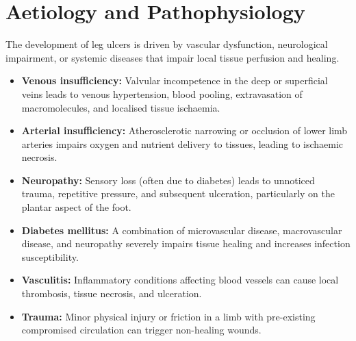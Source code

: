 \section*{Aetiology and Pathophysiology}
The development of leg ulcers is driven by vascular dysfunction, neurological impairment, or systemic diseases that impair local tissue perfusion and healing.
\begin{itemize}
    \item \textbf{Venous insufficiency:} Valvular incompetence in the deep or superficial veins leads to venous hypertension, blood pooling, extravasation of macromolecules, and localised tissue ischaemia.
    \item \textbf{Arterial insufficiency:} Atherosclerotic narrowing or occlusion of lower limb arteries impairs oxygen and nutrient delivery to tissues, leading to ischaemic necrosis.
    \item \textbf{Neuropathy:} Sensory loss (often due to diabetes) leads to unnoticed trauma, repetitive pressure, and subsequent ulceration, particularly on the plantar aspect of the foot.
    \item \textbf{Diabetes mellitus:} A combination of microvascular disease, macrovascular disease, and neuropathy severely impairs tissue healing and increases infection susceptibility.
    \item \textbf{Vasculitis:} Inflammatory conditions affecting blood vessels can cause local thrombosis, tissue necrosis, and ulceration.
    \item \textbf{Trauma:} Minor physical injury or friction in a limb with pre-existing compromised circulation can trigger non-healing wounds.
\end{itemize}

